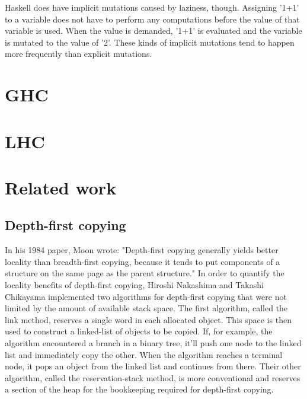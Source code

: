 \documentclass[a4paper,oneside]{memoir}
\begin{document}
Haskell does have implicit mutations caused by laziness, though. Assigning
'1+1' to a variable does not have to perform any computations before the value
of that variable is used. When the value is demanded, '1+1' is evaluated and
the variable is mutated to the value of '2'. These kinds of implicit mutations
tend to happen more frequently than explicit mutations.

\section{GHC}


\section{LHC}


\section{Related work}
\subsection{Depth-first copying}

In his 1984 paper, Moon wrote: "Depth-first copying generally yields better locality than
breadth-first copying, because it tends to put components of a structure on the
same page as the parent structure."
\cite{Moon:1984}
In order to quantify the locality benefits of depth-first copying,
Hiroshi Nakashima and Takashi Chikayama implemented two algorithms for depth-first
copying that were not limited by the amount of available stack space.\cite{Nakashima}
The first
algorithm, called the link method, reserves a single word in each allocated
object. This space is then used to construct a linked-list of objects to be copied.
If, for example, the algorithm encountered a branch in a binary tree, it'll push
one node to the linked list and immediately copy the other. When the algorithm
reaches a terminal node, it pops an object from the linked list and continues
from there.
Their other algorithm, called the reservation-stack method, is more conventional
and reserves a section of the heap for the bookkeeping required for depth-first
copying.
\end{document}
